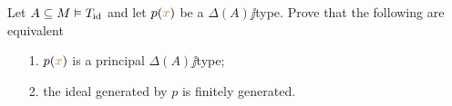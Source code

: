 \documentclass[creche.tex]{subfiles}
\begin{document}
\begin{exercise}\label{ex_fingen_principal}
Let $A\subseteq M\models T_{\rm id}$ and let $p({\mr x})$ be a $\Delta(A)\jj$type. Prove that the following are equivalent
\begin{itemize}
\item[1.] $p({\mr x})$ is a principal $\Delta(A)\jj$type;
\item[2.] the ideal generated by $p$ is finitely generated.\QED
\end{itemize}
\end{exercise}
\end{document}
